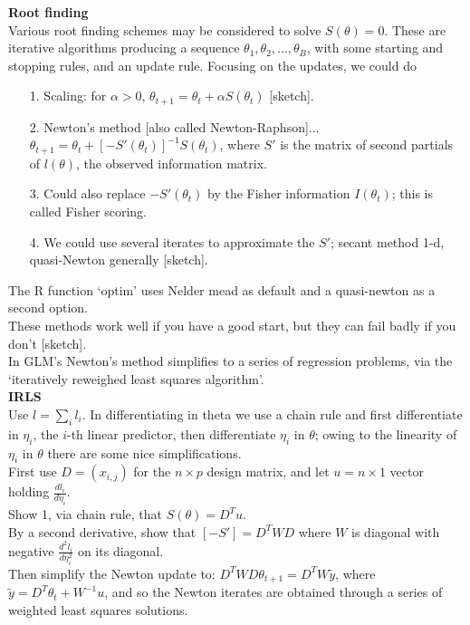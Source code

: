 \documentclass[11pt,a4paper]{article}
\begin{document}
\hspace{-0.5cm}\textbf{Root finding}\\
Various root finding schemes may be considered to solve $S(\theta) = 0$.  These are iterative algorithms producing a sequence $\theta_1, \theta_2, ..., \theta_B$, with some starting and stopping rules, and an update rule. Focusing on the updates, we could do
\begin{enumerate}
\item[1.] Scaling: for $\alpha > 0$, $\theta_{t+1} = \theta_t + \alpha S(\theta_t)$ [sketch].
\item[2.] Newton's method [also called Newton-Raphson]... $\theta_{t+1} = \theta_t + [ - S'(\theta_t) ]^{-1} S(\theta_t)$, where $S'$ is the matrix of second partials of $l(\theta)$, the observed information matrix.
\item[3.] Could also replace $-S'(\theta_t)$ by the Fisher information $I(\theta_t)$; this is called Fisher scoring.
\item[4.] We could use several iterates to approximate the $S'$; secant method 1-d, quasi-Newton generally [sketch].
\end{enumerate}
The R function `optim' uses Nelder mead as default and a quasi-newton as a second option.\\
These methods work well if you have a good start, but they can fail badly if you don't [sketch].\\
In GLM's Newton's method simplifies to a series of regression problems, via the `iteratively reweighed least squares algorithm'.\\

\hspace{-0.5cm}\textbf{IRLS}\\
Use $l = \sum_i l_i$.   In differentiating in theta we use a chain rule and first differentiate in $\eta_i$, the $i$-th linear predictor, then differentiate $\eta_i$ in $\theta$; owing to the linearity of $\eta_i$ in $\theta$ there are some nice simplifications.\\
First use $D = (x_{i,j})$ for the $n \times p$ design matrix, and let $u = n\times 1$ vector holding $\frac{d l_i}{d \eta_i}$.\\
Show 1, via chain rule, that $S(\theta) = D^T u$.\\
By a second derivative, show that $[- S'] = D^T W D$   where $W$ is diagonal with negative $\frac{d^2 l_i}{d \eta_i^2}$ on its diagonal.\\
Then simplify the Newton update to: $D^T W D \theta_{t+1} = D^T W \tilde{y}$, where $\tilde{y} = D^T \theta_t+ W^{-1} u$, and so the Newton iterates are obtained through a series of weighted least squares solutions.
\end{document}
